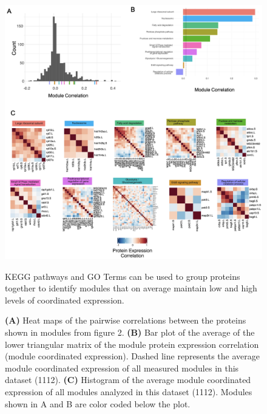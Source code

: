 \begin{figure}[hbt!]
\centering
\includegraphics[width=15cm, keepaspectratio]{figs/paper2/fig3.png}
\caption{KEGG pathways and GO Terms can be used to group proteins together to identify modules that on average maintain low and high levels of coordinated expression.}
\caption*{\textbf{(A)} Heat maps of the pairwise correlations between the proteins shown in modules from figure 2. \textbf{(B)} Bar plot of the average of the lower triangular matrix of the module protein expression correlation (module coordinated expression). Dashed line represents the average module coordinated expression of all measured modules in this dataset (1112). \textbf{(C)} Histogram of the average module coordinated expression of all modules analyzed in this dataset (1112). Modules shown in A and B are color coded below the plot.}
\label{fig:paper2_fig3}
\end{figure}


